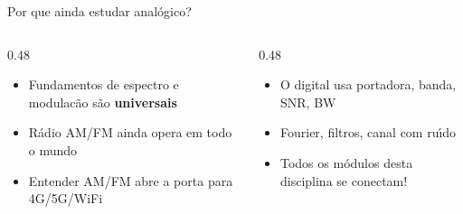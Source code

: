 \documentclass[aspectratio=169]{beamer}
\begin{document}

\begin{frame}{Por que ainda estudar anal\'{o}gico?}
\begin{columns}
\begin{column}{0.48\textwidth}
  \begin{itemize}
    \item Fundamentos de espectro e modulac\~{a}o s\~{a}o \textbf{universais}
    \item R\'{a}dio AM/FM ainda opera em todo o mundo
    \item Entender AM/FM abre a porta para 4G/5G/WiFi
  \end{itemize}
\end{column}
\begin{column}{0.48\textwidth}
  \begin{itemize}
    \item O digital usa portadora, banda, SNR, BW
    \item Fourier, filtros, canal com ru\'{\i}do
    \item \alert{Todos os m\'{o}dulos desta disciplina se conectam!}
  \end{itemize}
\end{column}
\end{columns}
\end{frame}
\end{document}
